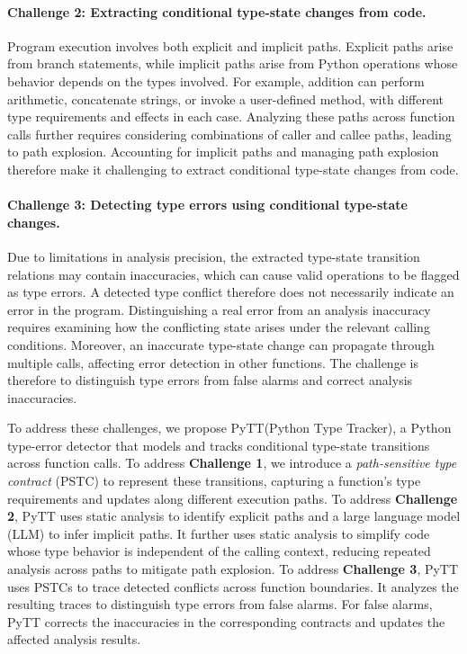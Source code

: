 \paragraph{Challenge 2: Extracting conditional type-state changes from code.}
Program execution involves both explicit and implicit paths. Explicit
paths arise from branch statements, while implicit paths arise from Python
operations whose behavior depends on the types involved. For example,
addition can perform arithmetic, concatenate strings, or invoke a
user-defined method, with different type requirements and effects in each
case. Analyzing these paths across function calls further requires
considering combinations of caller and callee paths, leading to path
explosion. Accounting for implicit paths and managing path explosion
therefore make it challenging to extract conditional type-state changes
from code.

\paragraph{Challenge 3: Detecting type errors using conditional type-state changes.}
Due to limitations in analysis precision, the extracted type-state
transition relations may contain inaccuracies, which can cause valid
operations to be flagged as type errors. A detected type conflict therefore
does not necessarily indicate
an error in the program. Distinguishing a real error from an analysis
inaccuracy requires examining how the conflicting state arises under the
relevant calling conditions. Moreover, an inaccurate type-state change
can propagate through multiple calls, affecting error detection in other
functions. The challenge is therefore to distinguish type errors
from false alarms and correct analysis inaccuracies.

To address these challenges, we propose PyTT(Python Type Tracker), a Python type-error detector
that models and tracks conditional type-state transitions across function
calls. To address \textbf{Challenge 1}, we introduce a
\emph{path-sensitive type contract} (PSTC) to represent these transitions,
capturing a function's type requirements and updates along different
execution paths. To address \textbf{Challenge 2}, PyTT uses static analysis
to identify explicit paths and a large language model (LLM) to infer
implicit paths. It further uses static analysis to
simplify code whose type behavior is independent of the calling context,
reducing repeated analysis across paths to mitigate path explosion.
To address \textbf{Challenge 3}, PyTT uses PSTCs to trace detected conflicts
across function boundaries. It analyzes the resulting traces to distinguish
type errors from false alarms. For false alarms, PyTT corrects the
inaccuracies in the corresponding contracts and updates the affected
analysis results.


